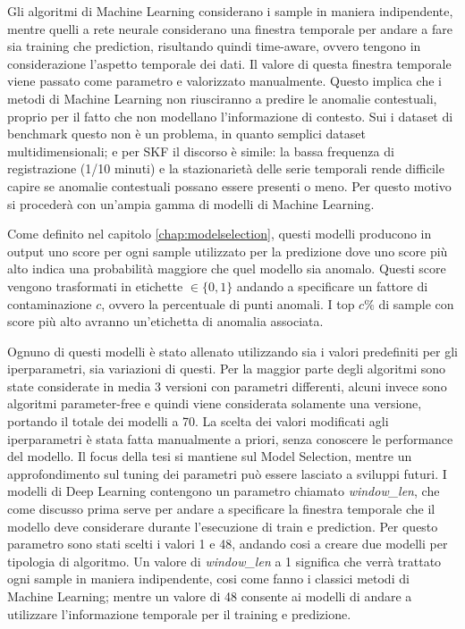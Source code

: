 Gli algoritmi di Machine Learning considerano i sample in maniera indipendente, mentre quelli a rete neurale considerano una finestra temporale per andare a fare sia training che prediction, risultando quindi time-aware, ovvero tengono in considerazione l'aspetto temporale dei dati. Il valore di questa finestra temporale viene passato come parametro e valorizzato manualmente.
Questo implica che i metodi di Machine Learning non riusciranno a predire le anomalie contestuali, proprio per il fatto che non modellano l'informazione di contesto. 
Sui i dataset di benchmark questo non è un problema, in quanto semplici dataset multidimensionali; e per SKF il discorso è simile: la bassa frequenza di registrazione (1/10 minuti) e la stazionarietà delle serie temporali rende difficile capire se anomalie contestuali possano essere presenti o meno. Per questo motivo si procederà con un'ampia gamma di modelli di Machine Learning.


Come definito nel capitolo \ref{chap:modelselection}, questi modelli producono in output uno score per ogni sample utilizzato per la predizione dove uno score più alto indica una probabilità maggiore che quel modello sia anomalo. Questi score vengono trasformati in etichette \(\in \{0,1\}\) andando a specificare un fattore di contaminazione $c$, ovvero la percentuale di punti anomali. I top $c\%$ di sample con score più alto avranno un'etichetta di anomalia associata. 

Ognuno di questi modelli è stato allenato utilizzando sia i valori predefiniti per gli iperparametri, sia variazioni di questi. 
Per la maggior parte degli algoritmi sono state considerate in media 3 versioni con parametri differenti, alcuni invece sono algoritmi parameter-free e quindi viene considerata solamente una versione, portando il totale dei modelli a 70.
La scelta dei valori modificati agli iperparametri è stata fatta manualmente a priori, senza conoscere le performance del modello. Il focus della tesi si mantiene sul Model Selection, mentre un approfondimento sul tuning dei parametri può essere lasciato a sviluppi futuri.
I modelli di Deep Learning contengono un parametro chiamato \textit{window\_len}, che come discusso prima serve per andare a specificare la finestra temporale che il modello deve considerare durante l'esecuzione di train e prediction. Per questo parametro sono stati scelti i valori 1 e 48, andando cosi a creare due modelli per tipologia di algoritmo. 
Un valore di \textit{window\_len} a 1 significa che verrà trattato ogni sample in maniera indipendente, cosi come fanno i classici metodi di Machine Learning; mentre un valore di 48 consente ai modelli di andare a utilizzare l'informazione temporale per il training e predizione.

